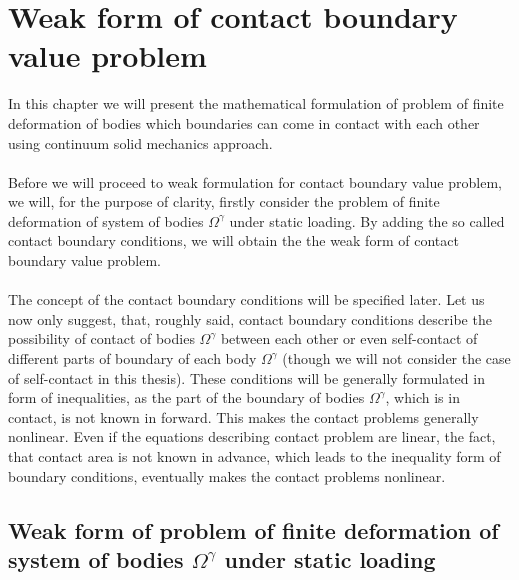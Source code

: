\documentclass{article}
\begin{document}
\section{Weak form of contact boundary value problem}
In this chapter we will present the mathematical formulation of problem of finite deformation of bodies which boundaries can come in contact with each other using continuum solid mechanics approach.
\\
\\
Before we will proceed to weak formulation for contact boundary value problem, we will, for the purpose of clarity, firstly consider the problem of finite deformation of system of bodies $ \Omega^{\gamma} $ under static loading. By adding the so called contact boundary conditions, we will obtain the the weak form of contact boundary value problem.
\\
\\
The concept of the contact boundary conditions will be specified later. Let us now only suggest, that, roughly said, contact boundary conditions describe the possibility of contact of bodies $ \Omega^{\gamma} $ between each other or even self-contact of different parts of boundary of each body $ \Omega^{\gamma} $ (though we will not consider the case of self-contact in this thesis). These conditions will be generally formulated in form of inequalities, as the part of the boundary of bodies $ \Omega^{\gamma} $, which is in contact, is not known in forward. This makes the contact problems generally nonlinear. Even if the equations describing contact problem are linear, the fact, that contact area is not known in advance, which leads to the inequality form of boundary conditions, eventually makes the contact problems nonlinear.   
\subsection{Weak form of problem of finite deformation of system of bodies $ \Omega^{\gamma} $ under static loading}
  
\end{document}
